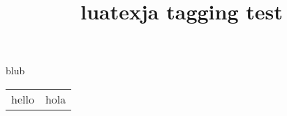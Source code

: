 \documentclass[10pt,a4paper]{report}
\title{luatexja tagging test}
\begin{document}
blub
\begin{tabular}{|l|p{3cm}|}
hello & hola
\end{tabular}
\end{document}
